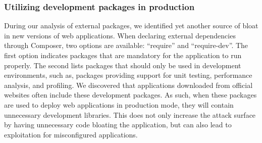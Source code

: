 \begin{table}[]
  \centering
  \caption{List of packages with known POP gadget chains}
\label{table:knowngadgets}
\end{table}


\subsubsection{Utilizing development packages in production}
During our analysis of external packages, we identified yet another source
of bloat in new versions of web applications. When declaring external
dependencies through Composer, two options are available: ``require'' and
``require-dev''. The first option indicates packages that are mandatory for
the application to run properly. The second lists packages that should only be
used in development environments, such as, packages providing support for unit
testing, performance analysis, and profiling. We discovered that applications
downloaded from official websites often include these development packages. As
such, when these packages are used to deploy web applications in production
mode, they will contain unnecessary development libraries. This does not
only increase the attack surface by having unnecessary code bloating the
application, but can also lead to exploitation for misconfigured applications.

